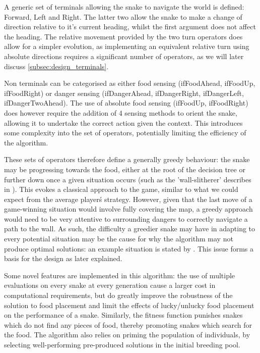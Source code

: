 \documentclass[british,10pt,a4paper]{article}
\begin{document}
A generic set of terminals allowing the snake to navigate the world is defined: Forward, Left and Right. The latter two allow the snake to make a change of direction relative to it's current heading, whilst the first argument does not affect the heading. The relative movement provided by the two turn operators does allow for a simpler evolution, as implementing an equivalent relative turn using absolute directions requires a significant number of operators, as we will later discuss \autoref{subsec:design_terminals}. \newline

Non terminals can be categorised as either food sensing (ifFoodAhead, ifFoodUp, ifFoodRight) or danger sensing (ifDangerAhead, ifDangerRight, ifDangerLeft, ifDangerTwoAhead). The use of absolute food sensing (ifFoodUp, ifFoodRight) does however require the addition of 4 sensing methods to orient the snake, allowing it to undertake the correct action given the context. This introduces some complexity into the set of operators, potentially limiting the efficiency of the algorithm.\newline

These sets of operators therefore define a generally greedy behaviour: the snake may be progressing towards the food, either at the root of the decision tree or further down once a given situation occurs (such as the 'wall-slitherer' describes in \cite{Ehlis2000-sz}). This evokes a classical approach to the game, similar to what we could expect from the average player\'s strategy. However, given that the last move of a game-winning situation would involve fully covering the map, a greedy approach would need to be very attentive to surrounding dangers to correctly navigate a path to the wall. As such, the difficulty a greedier snake may have in adapting to every potential situation may be the cause for why the algorithm may not produce optimal solutions: an example situation is stated by \citeauthor{Ehlis2000-sz}. This issue forms a basis for the design as later explained. \newline

Some novel features are implemented in this algorithm: the use of multiple evaluations on every snake at every generation cause a larger cost in computational requirements, but do greatly improve the robustness of the solution to food placement and limit the effects of lucky/unlucky food placement on the performance of a snake. Similarly, the fitness function punishes snakes which do not find any pieces of food, thereby promoting snakes which search for the food. The algorithm also relies on priming the population of individuals, by selecting well-performing pre-produced solutions in the initial breeding pool.
\end{document}
